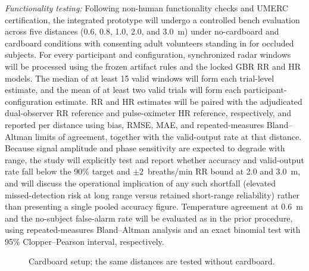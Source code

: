 \documentclass[10pt,conference]{IEEEtran}
\begin{document}
\textit{Functionality testing:}  Following non-human functionality checks and UMERC certification, the integrated prototype will undergo a controlled bench evaluation across five distances (0.6, 0.8, 1.0, 2.0, and 3.0~m) under no-cardboard and cardboard conditions with consenting adult volunteers standing in for occluded subjects. For every participant and configuration, synchronized radar windows will be processed using the frozen artifact rules and the locked GBR RR and HR models. The median of at least 15 valid windows will form each trial-level estimate, and the mean of at least two valid trials will form each participant-configuration estimate. RR and HR estimates will be paired with the adjudicated dual-observer RR reference and pulse-oximeter HR reference, respectively, and reported per distance using bias, RMSE, MAE, and repeated-measures Bland--Altman limits of agreement, together with the valid-output rate at that distance. Because signal amplitude and phase sensitivity are expected to degrade with range, the study will explicitly test and report whether accuracy and valid-output rate fall below the 90\% target and $\pm2$~breaths/min RR bound at 2.0 and 3.0~m, and will discuss the operational implication of any such shortfall (elevated missed-detection risk at long range versus retained short-range reliability) rather than presenting a single pooled accuracy figure. Temperature agreement at 0.6~m and the no-subject false-alarm rate will be evaluated as in the prior procedure, using repeated-measures Bland--Altman analysis and an exact binomial test with 95\% Clopper--Pearson interval, respectively.

\begin{figure}[!ht]
\centering
{}
\caption{Cardboard setup; the same distances are tested without cardboard.}
\label{fig:testsetup}
\end{figure}
\end{document}
